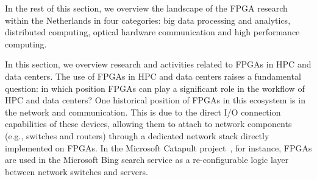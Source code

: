 In the rest of this section, we overview the landscape of the FPGA research within the Netherlands in four categories: big data processing and analytics, distributed computing, optical hardware communication and high performance computing.
\fi

In this section, we overview research and activities related to FPGAs in HPC and data centers. The use of FPGAs in HPC and data centers raises a fundamental question: in which position FPGAs can play a significant role in the workflow of HPC and data centers?
One historical position of FPGAs in this ecosystem is in the network and communication. 
This is due to the direct I/O connection capabilities of these devices, allowing them to attach to network components (e.g., switches and routers) through a dedicated network stack directly implemented on FPGAs.
In the Microsoft Catapult project~\cite{caulfield2016cloud, PutnamAServices}, for instance, FPGAs are used in the Microsoft Bing search service as %
a re-configurable logic layer %
between network switches and servers. %

